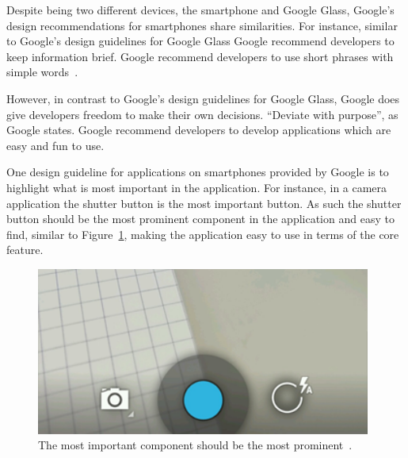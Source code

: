 Despite being two different devices, the smartphone and Google Glass, Google's design recommendations for smartphones share similarities. For instance, similar to Google's design guidelines for Google Glass Google recommend developers to keep information brief. Google recommend developers to use short phrases with simple words~\cite{androidDesignPrinciples}.

However, in contrast to Google's design guidelines for Google Glass, Google does give developers freedom to make their own decisions. ``Deviate with purpose'', as Google states. Google recommend developers to develop applications which are easy and fun to use. %




One design guideline for applications on smartphones provided by Google is to highlight what is most important in the application. For instance, in a camera application the shutter button is the most important button. As such the shutter button should be the most prominent component in the application and easy to find, similar to Figure~\ref{smartphonePrincinples2}, making the application easy to use in terms of the core feature.

	\begin{figure}[ht!]
		\centering
		\includegraphics[width=110mm]{images/principles_make_important_fast}
		\caption{The most important component should be the most prominent~\cite{androidDesignPrinciples}.}
		\label{smartphonePrincinples2}
	\end{figure}

